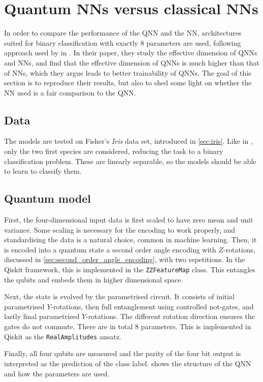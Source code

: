 \section{Quantum NNs versus classical NNs}
\label{sec:qnn-vs-nn}

In order to compare the performance of the QNN and the NN, architectures suited for binary classification with exactly 8 parameters are used, following approach used by \textcite{abbas2021} in .
In their paper, they study the effective dimension of QNNs and NNs, and find that the effective dimension of QNNs is much higher than that of NNs, which they argue leads to better trainability of QNNs.
The goal of this section is to reproduce their results, but also to shed some light on whether the NN used is a fair comparison to the QNN.

\subsection{Data}
The models are tested on Fisher's \textit{Iris} data set, introduced in \cref{sec:iris}.
Like in \cite{abbas2021}, only the two first species are considered, reducing the task to a binary classification problem.
These are linearly separable, so the models should be able to learn to classify them.

\subsection{Quantum model}
First, the four-dimensional input data is first scaled to have zero mean and unit variance.
Some scaling is necessary for the encoding to work properly, and standardising the data is a natural choice, common in machine learning.
Then, it is encoded into a quantum state a second order angle encoding with $Z$-rotations, discussed in \cref{sec:second_order_angle_encoding}, with two repetitions.
In the Qiskit framework, this is implemented in the \texttt{ZZFeatureMap} class.
This entangles the qubits and embeds them in higher dimensional space.

Next, the state is evolved by the parametrised circuit.
It consists of initial parametrised $Y$-rotations, then full entanglement using controlled not-gates, and lastly final parametrised $Y$-rotations.
The different rotation direction ensures the gates do not commute.
There are in total 8 parameters.
This is implemented in Qiskit as the \texttt{RealAmplitudes} ansatz.

Finally, all four qubits are measured and the parity of the four bit output is interpreted as the prediction of the class label.
 shows the structure of the QNN and how the parameters are used.


